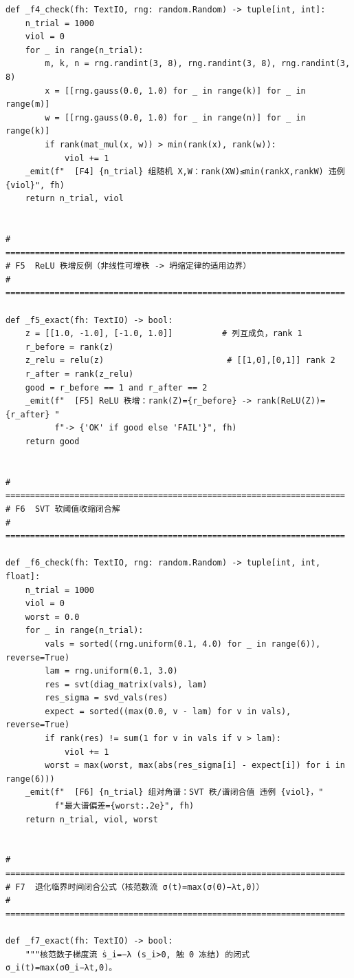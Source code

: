 \documentclass[UTF8,11pt,a4paper]{ctexart}
\theoremstyle{plain}
\theoremstyle{definition}
\theoremstyle{remark}
\begin{document}
\begin{Verbatim}[fontsize=\scriptsize,frame=single,breaklines=true,breakanywhere=true,breaksymbolleft={}]
def _f4_check(fh: TextIO, rng: random.Random) -> tuple[int, int]:
    n_trial = 1000
    viol = 0
    for _ in range(n_trial):
        m, k, n = rng.randint(3, 8), rng.randint(3, 8), rng.randint(3, 8)
        x = [[rng.gauss(0.0, 1.0) for _ in range(k)] for _ in range(m)]
        w = [[rng.gauss(0.0, 1.0) for _ in range(n)] for _ in range(k)]
        if rank(mat_mul(x, w)) > min(rank(x), rank(w)):
            viol += 1
    _emit(f"  [F4] {n_trial} 组随机 X,W：rank(XW)≤min(rankX,rankW) 违例 {viol}", fh)
    return n_trial, viol


# =====================================================================
# F5  ReLU 秩增反例（非线性可增秩 -> 坍缩定律的适用边界）
# =====================================================================

def _f5_exact(fh: TextIO) -> bool:
    z = [[1.0, -1.0], [-1.0, 1.0]]          # 列互成负，rank 1
    r_before = rank(z)
    z_relu = relu(z)                         # [[1,0],[0,1]] rank 2
    r_after = rank(z_relu)
    good = r_before == 1 and r_after == 2
    _emit(f"  [F5] ReLU 秩增：rank(Z)={r_before} -> rank(ReLU(Z))={r_after} "
          f"-> {'OK' if good else 'FAIL'}", fh)
    return good


# =====================================================================
# F6  SVT 软阈值收缩闭合解
# =====================================================================

def _f6_check(fh: TextIO, rng: random.Random) -> tuple[int, int, float]:
    n_trial = 1000
    viol = 0
    worst = 0.0
    for _ in range(n_trial):
        vals = sorted((rng.uniform(0.1, 4.0) for _ in range(6)), reverse=True)
        lam = rng.uniform(0.1, 3.0)
        res = svt(diag_matrix(vals), lam)
        res_sigma = svd_vals(res)
        expect = sorted((max(0.0, v - lam) for v in vals), reverse=True)
        if rank(res) != sum(1 for v in vals if v > lam):
            viol += 1
        worst = max(worst, max(abs(res_sigma[i] - expect[i]) for i in range(6)))
    _emit(f"  [F6] {n_trial} 组对角谱：SVT 秩/谱闭合值 违例 {viol}，"
          f"最大谱偏差={worst:.2e}", fh)
    return n_trial, viol, worst


# =====================================================================
# F7  退化临界时间闭合公式（核范数流 σ(t)=max(σ(0)−λt,0)）
# =====================================================================

def _f7_exact(fh: TextIO) -> bool:
    """核范数子梯度流 ṡ_i=−λ (s_i>0, 触 0 冻结) 的闭式 σ_i(t)=max(σ0_i−λt,0)。


\end{Verbatim}
\end{document}
